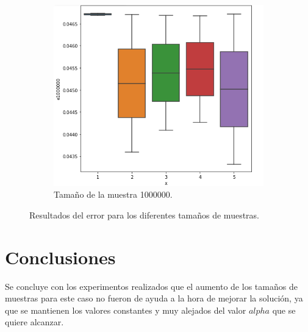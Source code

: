 \documentclass{article}
\begin{document}
\begin{figure}
		\begin{subfigure}[b]{0.45\linewidth}
			\includegraphics[width=\linewidth]{e1000000.png}
			\caption{Tamaño de la muestra 1000000.}
			\label{5}
		\end{subfigure}
	\caption{Resultados del error para los diferentes tamaños de muestras.}  		
\end{figure}



\section{Conclusiones}
Se concluye con los experimentos realizados que el aumento de los tamaños de muestras para este caso no fueron de ayuda a la hora de mejorar la solución, ya que se mantienen los valores constantes y muy alejados del valor $alpha$ que se quiere alcanzar.



\end{document}
